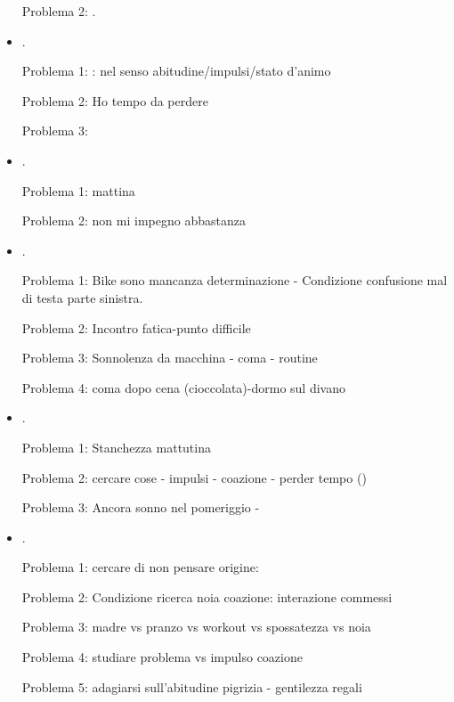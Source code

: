 \begin{itemize}
Problema 2: .

\item {}.

Problema 1: : nel senso abitudine/impulsi/stato d'animo

Problema 2: Ho tempo da perdere

Problema 3: 

\item {}.

Problema 1: mattina 

Problema 2: non mi impegno abbastanza

\item {}.

Problema 1: Bike sono mancanza determinazione - Condizione confusione mal di testa parte sinistra.

Problema 2: Incontro fatica-punto difficile

Problema 3: Sonnolenza da macchina - coma - routine

Problema 4: coma dopo cena (cioccolata)-dormo sul divano

\item {}.

Problema 1: Stanchezza mattutina

Problema 2: cercare cose - impulsi - coazione - perder tempo ()

Problema 3: Ancora sonno nel pomeriggio - 

\item {}.

Problema 1: cercare di non pensare origine: 

Problema 2: Condizione ricerca noia coazione: interazione commessi

Problema 3: madre vs pranzo vs workout vs spossatezza vs noia

Problema 4: studiare problema vs impulso coazione

Problema 5: adagiarsi sull'abitudine pigrizia - gentilezza regali


\end{itemize}
